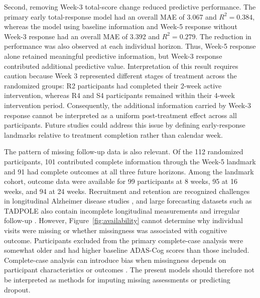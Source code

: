 \documentclass[11pt]{article}
\begin{document}
Second, removing Week-3 total-score change reduced predictive performance. The primary early total-response model had an overall MAE of 3.067 and $R^2=0.384$, whereas the model using baseline information and Week-5 response without Week-3 response had an overall MAE of 3.392 and $R^2=0.279$. The reduction in performance was also observed at each individual horizon. Thus, Week-5 response alone retained meaningful predictive information, but Week-3 response contributed additional predictive value. Interpretation of this result requires caution because Week 3 represented different stages of treatment across the randomized groups: R2 participants had completed their 2-week active intervention, whereas R4 and S4 participants remained within their 4-week intervention period. Consequently, the additional information carried by Week-3 response cannot be interpreted as a uniform post-treatment effect across all participants. Future studies could address this issue by defining early-response landmarks relative to treatment completion rather than calendar week.

The pattern of missing follow-up data is also relevant. Of the 112 randomized participants, 101 contributed complete information through the Week-5 landmark and 91 had complete outcomes at all three future horizons. Among the landmark cohort, outcome data were available for 99 participants at 8 weeks, 95 at 16 weeks, and 94 at 24 weeks. Recruitment and retention are recognized challenges in longitudinal Alzheimer disease studies \citep{grill2010retention}, and large forecasting datasets such as TADPOLE also contain incomplete longitudinal measurements and irregular follow-up \citep{marinescu2021tadpole}. However, Figure~\ref{fig:availability} cannot determine why individual visits were missing or whether missingness was associated with cognitive outcome. Participants excluded from the primary complete-case analysis were somewhat older and had higher baseline ADAS-Cog scores than those included. Complete-case analysis can introduce bias when missingness depends on participant characteristics or outcomes \citep{sterne2009missing}. The present models should therefore not be interpreted as methods for imputing missing assessments or predicting dropout.
\end{document}
